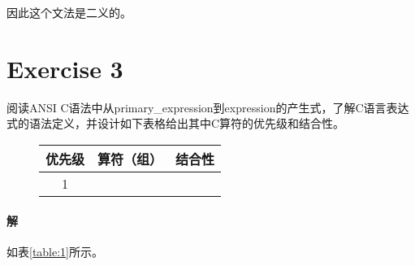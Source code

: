 \documentclass{article}
\begin{document}
因此这个文法是二义的。
\\

\section{Exercise 3}
阅读ANSI C语法中从primary\_expression到expression的产生式，了解C语言表达式的语法定义，并设计如下表格给出其中C算符的优先级和结合性。
\FloatBarrier

\begin{figure}[H]
    \centering
    \begin{tabular}{cll}
        \hline
        \textbf{优先级} & \multicolumn{1}{c}{\textbf{算符（组）}} & \multicolumn{1}{c}{\textbf{结合性}} \\ \hline
1 &  &
    \end{tabular}
\end{figure}

\FloatBarrier
\paragraph{解}
如表\ref{table:1}所示。
\end{document}
